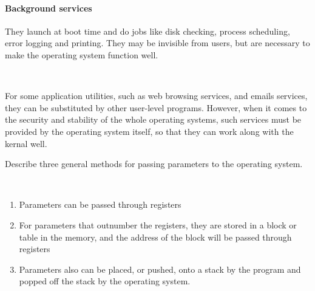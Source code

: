 \begin{exercise}[]
\begin{solution}
      \paragraph{Background services}  They launch at boot time and do jobs like disk checking, process scheduling, error logging and printing. They may be invisible from users, but are necessary to make the operating system function well.

      \par{~}

      For some application utilities, such as web browsing services, and emails services, they can be substituted by other user-level programs. However, when it comes to the security and stability of the whole operating systems, such services must be provided by the operating system itself, so that they can work along with the kernal well. 
  
  \end{solution}
  \label{ex1}
\end{exercise}

\begin{exercise}[]{Describe three general methods for passing parameters to the operating
    system.}
  \begin{solution}
  \par{~}
  \begin{enumerate}
    \item Parameters can be passed through registers
    \item For parameters that outnumber the registers, they are stored in a block or table in the memory, and the address of the block will be passed through registers
    \item Parameters also can be placed, or pushed, onto a stack by the program and popped off the stack by the operating system.
  \end{enumerate}
  \end{solution}
  \label{ex2}
\end{exercise}



